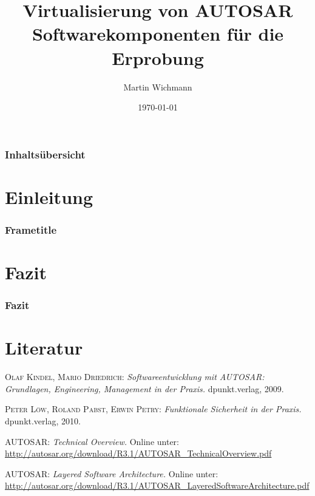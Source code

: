 \documentclass[]{beamer}
\author{Martin Wichmann}
\title[Virtualisierung von AUTOSAR Softwarekomponenten]{Virtualisierung von AUTOSAR Softwarekomponenten für die Erprobung}
\date{\today}
\institute{Ostfalia Hochschule für angewandte Wissenschaften}
\begin{document}
\begin{frame}
\maketitle
\end{frame}


\begin{frame}
\frametitle{Inhaltsübersicht}
\tableofcontents
\end{frame}





\section{Einleitung}
\label{sec:einleitung}

\begin{frame}
\frametitle{Frametitle}



\end{frame}

\section{Fazit}
\label{sec:Fazit}

\begin{frame}
\frametitle{Fazit}


\end{frame}








\appendix
\section*{Literatur}
\label{sec:Literatur}

\begin{frame}


\begin{thebibliography}{10}

 \textsc{Olaf Kindel, Mario Driedrich}: {\em Softwareentwicklung mit AUTOSAR: Grundlagen, Engineering, Management in der Praxis.} dpunkt.verlag, 2009.

 \textsc{Peter Löw, Roland Pabst, Erwin Petry}: {\em Funktionale Sicherheit in der Praxis.} dpunkt.verlag, 2010.

 \textsc{AUTOSAR}: {\em Technical Overview.} Online unter: \url{http://autosar.org/download/R3.1/AUTOSAR_TechnicalOverview.pdf}

 \textsc{AUTOSAR}: {\em Layered Software Architecture.} Online unter: \url{http://autosar.org/download/R3.1/AUTOSAR_LayeredSoftwareArchitecture.pdf}

\end{thebibliography}


\end{frame}
\end{document}
